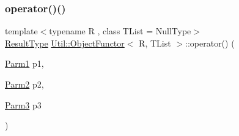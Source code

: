 \mbox{\label{classUtil_1_1ObjectFunctor_a6dea319b30584bd1bb9f6bf4b8d36e11}} 
\subsubsection{\texorpdfstring{operator()()}{operator()()}\hspace{0.1cm}{\footnotesize\ttfamily [12/18]}}
{\footnotesize\ttfamily template$<$typename R , class T\+List  = Null\+Type$>$ \\
\mbox{\hyperlink{classUtil_1_1ObjectFunctor_a77f816e98108848347d0dfc085090a1c}{Result\+Type}} \mbox{\hyperlink{classUtil_1_1ObjectFunctor}{Util\+::\+Object\+Functor}}$<$ R, T\+List $>$\+::operator() (\begin{DoxyParamCaption}\item[{\mbox{\hyperlink{classUtil_1_1ObjectFunctor_a199715d28029627c2ae7219c13b04d26}{Parm1}}}]{p1,  }\item[{\mbox{\hyperlink{classUtil_1_1ObjectFunctor_a6809cf65883dc7575e01d9b9849649cf}{Parm2}}}]{p2,  }\item[{\mbox{\hyperlink{classUtil_1_1ObjectFunctor_a6becd26610c6091b9ba93cd96f3def66}{Parm3}}}]{p3 }\end{DoxyParamCaption})\hspace{0.3cm}{\ttfamily [inline]}}

\mbox{\label{classUtil_1_1ObjectFunctor_a87c6264782e6c535c3a66f385d922f12}} 

